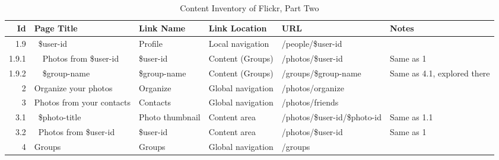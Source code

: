 \documentclass[12pt,a4paper]{article}
\begin{document}
\begin{landscape}
  \begin{table}[h!b!p!]
    \caption{Content Inventory of Flickr, Part Two}
    \label{table:flickr.content.inventory.2}
    \begin{center}
      \begin{tiny}
        \tt
        \begin{tabular}{r|l|l|l|l|p{3cm}}
            Id &
            Page Title &
            Link Name &
            Link Location &
            URL &
            Notes \\

            \hline

              1.9 &
              ~\$user-id &
              Profile &
              Local navigation &
              /people/\$user-id &
              \\

                1.9.1 &
                ~~Photos from \$user-id &
                \$user-id &
                Content (Groups) &
                /photos/\$user-id &
                Same as 1 \\

                1.9.2 &
                ~~\$group-name &
                \$group-name &
                Content (Groups) &
                /groups/\$group-name &
                Same as 4.1, explored there \\

            2 &
            Organize your photos &
            Organize &
            Global navigation &
            /photos/organize &
            \\

            3 &
            Photos from your contacts &
            Contacts &
            Global navigation &
            /photos/friends &
            \\

              3.1 &
              ~\$photo-title &
              Photo thumbnail &
              Content area &
              /photos/\$user-id/\$photo-id &
              Same as 1.1 \\

              3.2 &
              ~Photos from \$user-id &
              \$user-id &
              Content area &
              /photos/\$user-id &
              Same as 1 \\

            4 &
            Groups &
            Groups &
            Global navigation &
            /groups &
            \\


\end{tabular}
\end{tiny}
\end{center}
\end{table}
\end{landscape}
\end{document}
